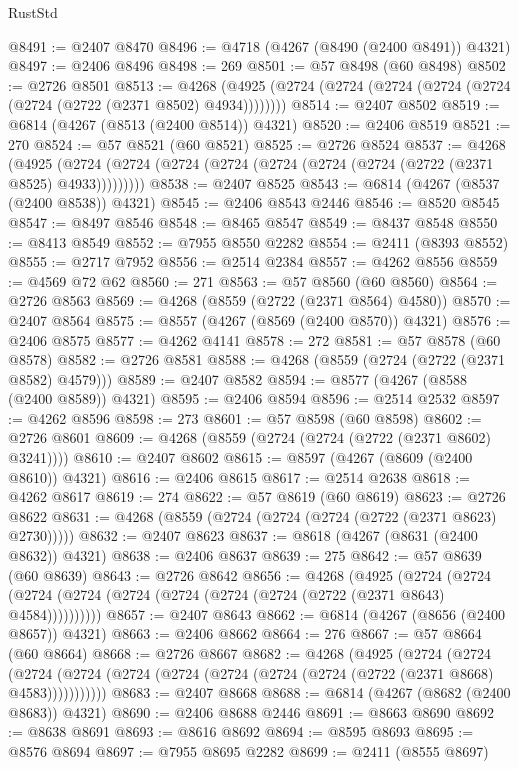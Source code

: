 \begin{lexlean}{RustStd}
\begin{coremodule}
@8491 := @2407 @8470
@8496 := @4718 (@4267 (@8490 (@2400 @8491)) @4321)
@8497 := @2406 @8496
@8498 := 269
@8501 := @57 @8498 (@60 @8498)
@8502 := @2726 @8501
@8513 := @4268 (@4925 (@2724 (@2724 (@2724 (@2724 (@2724 (@2724 (@2722 (@2371 @8502) @4934))))))))
@8514 := @2407 @8502
@8519 := @6814 (@4267 (@8513 (@2400 @8514)) @4321)
@8520 := @2406 @8519
@8521 := 270
@8524 := @57 @8521 (@60 @8521)
@8525 := @2726 @8524
@8537 := @4268
    (@4925 (@2724 (@2724 (@2724 (@2724 (@2724 (@2724 (@2724 (@2722 (@2371 @8525) @4933)))))))))
@8538 := @2407 @8525
@8543 := @6814 (@4267 (@8537 (@2400 @8538)) @4321)
@8545 := @2406 @8543 @2446
@8546 := @8520 @8545
@8547 := @8497 @8546
@8548 := @8465 @8547
@8549 := @8437 @8548
@8550 := @8413 @8549
@8552 := @7955 @8550 @2282
@8554 := @2411 (@8393 @8552)
@8555 := @2717 @7952
@8556 := @2514 @2384
@8557 := @4262 @8556
@8559 := @4569 @72 @62
@8560 := 271
@8563 := @57 @8560 (@60 @8560)
@8564 := @2726 @8563
@8569 := @4268 (@8559 (@2722 (@2371 @8564) @4580))
@8570 := @2407 @8564
@8575 := @8557 (@4267 (@8569 (@2400 @8570)) @4321)
@8576 := @2406 @8575
@8577 := @4262 @4141
@8578 := 272
@8581 := @57 @8578 (@60 @8578)
@8582 := @2726 @8581
@8588 := @4268 (@8559 (@2724 (@2722 (@2371 @8582) @4579)))
@8589 := @2407 @8582
@8594 := @8577 (@4267 (@8588 (@2400 @8589)) @4321)
@8595 := @2406 @8594
@8596 := @2514 @2532
@8597 := @4262 @8596
@8598 := 273
@8601 := @57 @8598 (@60 @8598)
@8602 := @2726 @8601
@8609 := @4268 (@8559 (@2724 (@2724 (@2722 (@2371 @8602) @3241))))
@8610 := @2407 @8602
@8615 := @8597 (@4267 (@8609 (@2400 @8610)) @4321)
@8616 := @2406 @8615
@8617 := @2514 @2638
@8618 := @4262 @8617
@8619 := 274
@8622 := @57 @8619 (@60 @8619)
@8623 := @2726 @8622
@8631 := @4268 (@8559 (@2724 (@2724 (@2724 (@2722 (@2371 @8623) @2730)))))
@8632 := @2407 @8623
@8637 := @8618 (@4267 (@8631 (@2400 @8632)) @4321)
@8638 := @2406 @8637
@8639 := 275
@8642 := @57 @8639 (@60 @8639)
@8643 := @2726 @8642
@8656 := @4268
    (@4925
      (@2724 (@2724 (@2724 (@2724 (@2724 (@2724 (@2724 (@2724 (@2722 (@2371 @8643) @4584))))))))))
@8657 := @2407 @8643
@8662 := @6814 (@4267 (@8656 (@2400 @8657)) @4321)
@8663 := @2406 @8662
@8664 := 276
@8667 := @57 @8664 (@60 @8664)
@8668 := @2726 @8667
@8682 := @4268
    (@4925
      (@2724
        (@2724
          (@2724 (@2724 (@2724 (@2724 (@2724 (@2724 (@2724 (@2722 (@2371 @8668) @4583)))))))))))
@8683 := @2407 @8668
@8688 := @6814 (@4267 (@8682 (@2400 @8683)) @4321)
@8690 := @2406 @8688 @2446
@8691 := @8663 @8690
@8692 := @8638 @8691
@8693 := @8616 @8692
@8694 := @8595 @8693
@8695 := @8576 @8694
@8697 := @7955 @8695 @2282
@8699 := @2411 (@8555 @8697)

\end{coremodule}
\end{lexlean}

